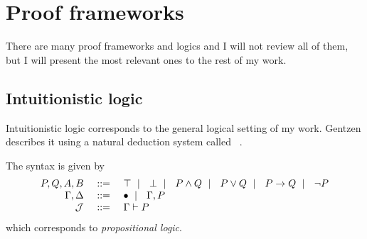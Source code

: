 \section{Proof frameworks}

There are many proof frameworks and logics and I will not review all of them,
but I will present the most relevant ones to the rest of my work.

\subsection{Intuitionistic logic}

Intuitionistic logic corresponds to the general logical setting of my work.
Gentzen describes it using a natural deduction system called
\NJ~.

The syntax is given by
\[
  \begin{array}{rrl}
    P, Q, A, B &\ \mathrel{{:}{:}{=}}\ & \top \ \mid\ \  \bot \ \mid\ \  P \wedge Q \ \mid\ \  P \vee Q
    \ \mid\ \  P \to Q \ \mid\ \  \neg P \\
    \Gamma, \Delta &\ \mathrel{{:}{:}{=}}\ & \bullet \ \mid\ \  \Gamma, P \\
    \mathcal{J} &\ \mathrel{{:}{:}{=}}\ & \Gamma \vdash P
  \end{array}
\]
which corresponds to \emph{propositional logic}.


